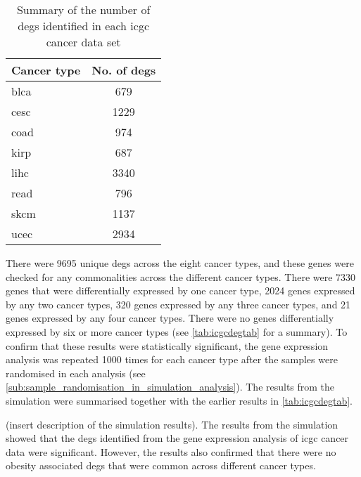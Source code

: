 \begin{table}[htbp]
	\centering
	\caption{Summary of the number of \glspl{deg} identified in each \gls{icgc} cancer data set}
	\label{tab:icgcdegnum}
	\begin{tabular}{lc}
		Cancer type & No. of \glspl{deg}\\
		\hline
		\rule{0pt}{2.25ex}\gls{blca} & 679 \\
		\gls{cesc} & 1229\\
		\gls{coad} & 974\\
		\gls{kirp} & 687\\
		\gls{lihc} & 3340\\
		\gls{read} & 796\\
		\gls{skcm} & 1137\\
		\gls{ucec} & 2934\\
		\hline
		\hline
	\end{tabular}
\end{table}

There were 9695 unique \glspl{deg} across the eight cancer types, and these genes were checked for any commonalities across the different cancer types.
There were 7330 genes that were differentially expressed by one cancer type, 2024 genes expressed by any two cancer types, 320 genes expressed by any three cancer types, and 21 genes expressed by any four cancer types.
There were no genes differentially expressed by six or more cancer types (see \cref{tab:icgcdegtab} for a summary).
To confirm that these results were statistically significant, the gene expression analysis was repeated 1000 times for each cancer type after the samples were randomised in each analysis (see \cref{sub:sample_randomisation_in_simulation_analysis}).
The results from the simulation were summarised together with the earlier results in \cref{tab:icgcdegtab}.

(insert description of the simulation results).
The results from the simulation showed that the \glspl{deg} identified from the gene expression analysis of \gls{icgc} cancer data were significant.
However, the results also confirmed that there were no obesity associated \glspl{deg} that were common across different cancer types.

